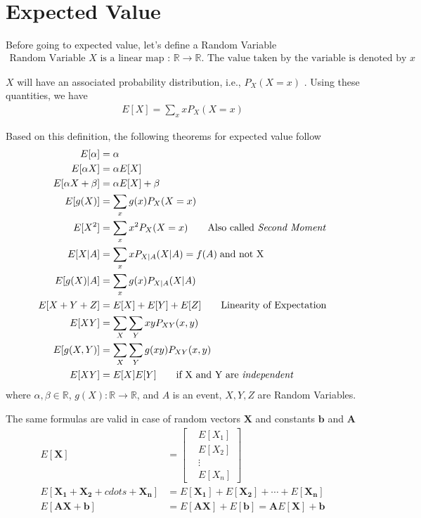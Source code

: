 \documentclass[../probability-notes.tex]{subfiles}
\begin{document}
    \section{Expected Value}
    Before going to expected value, let's define a Random Variable
    \begin{align*}
        \text{Random Variable } X \text{ is a linear map : } \mathbb{R} \to \mathbb{R} \text{. The value taken by the variable is denoted by } x
    \end{align*}
    
    $X$ will have an associated probability distribution, i.e., $P_{X}(X = x)$ . Using these quantities, we have
    \begin{align*}
        E[X] = \sum_x xP_{X}(X = x) \tag*{Expected Value}
    \end{align*}

    Based on this definition, the following theorems for expected value follow
    \begin{align*}
        E[\alpha] &= \alpha\\
        E[\alpha X] &= \alpha E[X] \\
        E[\alpha X + \beta] &= \alpha E[X] + \beta \\
        E[g(X)] &= \sum_x g(x)P_{X}(X = x) \\
        E[X^{2}] &= \sum_x x^{2} P_{X}(X = x) \tag*{Also called \emph{Second Moment}}\\
        E[X|A] &= \sum_{x} x P_{X|A}(X|A) = f(A)\;\text{and not X}\\
        E[g(X)|A] &= \sum_{x} g(x) P_{X|A}(X|A) \\
        E[X + Y + Z] &= E[X] + E[Y] + E[Z] \tag*{Linearity of Expectation}\\
        E[XY] &= \sum_{X} \sum_{Y} xy P_{XY}(x,y) \\
        E[g(X,Y)] &= \sum_{X} \sum_{Y} g(xy) P_{XY}(x,y) \\
        E[XY] &= E[X]E[Y] \tag*{if X and Y are \emph{independent}}
    \end{align*}
    where $\alpha, \beta \in \mathbb{R}$, $g(X) : \mathbb{R} \rightarrow \mathbb{R}$, and $A$ is an event, $X, Y, Z$ are Random Variables.\newline

    The same formulas are valid in case of random vectors $\mathbf{X}$ and constants $\mathbf{b}$ and $\mathbf{A}$
    \begin{align*}
        E[\mathbf{X}] &= \begin{bmatrix}
        &E[X_{1}]\\
        &E[X_{2}]\\
        &\vdots\\
        &E[X_{n}]
        \end{bmatrix}\\
        E[\mathbf{X_{1}} + \mathbf{X_{2}} + cdots + \mathbf{X_{n}}] &= E[\mathbf{X_{1}}] + E[\mathbf{X_{2}}] + \cdots + E[\mathbf{X_{n}}]\\
        E[\mathbf{A}\mathbf{X}+\mathbf{b}] &= E[\mathbf{A}\mathbf{X}] + E[\mathbf{b}] = \mathbf{A}E[\mathbf{X}] + \mathbf{b}\\
    \end{align*}
\end{document}
